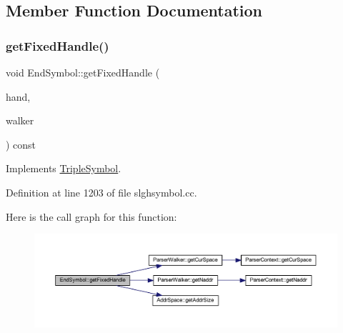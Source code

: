 \subsection{Member Function Documentation}
\mbox{\label{class_end_symbol_a077a2986de808e3aec22ef7fe2dad5a8}} 
\subsubsection{\texorpdfstring{getFixedHandle()}{getFixedHandle()}}
{\footnotesize\ttfamily void End\+Symbol\+::get\+Fixed\+Handle (\begin{DoxyParamCaption}\item[{\mbox{\hyperlink{struct_fixed_handle}{Fixed\+Handle}} \&}]{hand,  }\item[{\mbox{\hyperlink{class_parser_walker}{Parser\+Walker}} \&}]{walker }\end{DoxyParamCaption}) const\hspace{0.3cm}{\ttfamily [virtual]}}



Implements \mbox{\hyperlink{class_triple_symbol_aa71f48c79a2bee73e97fdfb8163b4e46}{Triple\+Symbol}}.



Definition at line 1203 of file slghsymbol.\+cc.

Here is the call graph for this function\+:
\nopagebreak
\begin{figure}[H]
\begin{center}
\leavevmode
\includegraphics[width=350pt]{class_end_symbol_a077a2986de808e3aec22ef7fe2dad5a8_cgraph}
\end{center}
\end{figure}
\mbox{\label{class_end_symbol_a950a96cd8076dd9e98057751d23aa6de}} 
